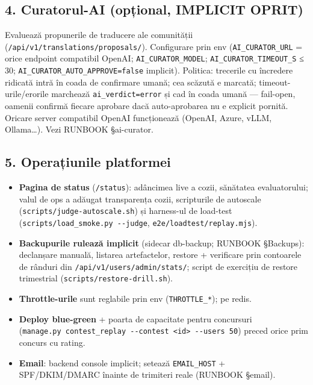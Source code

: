 \documentclass[
]{article}
\providecommand{\tightlist}{%
  \setlength{\itemsep}{0pt}\setlength{\parskip}{0pt}}
\begin{document}
\subsection{4. Curatorul-AI (opțional, IMPLICIT
OPRIT)}\label{4-curatorul-ai-opux21bional-implicit-oprit}

Evaluează propunerile de traducere ale comunității
(\texttt{/api/v1/translations/proposals/}). Configurare prin env
(\texttt{AI\_CURATOR\_URL} = orice endpoint compatibil OpenAI;
\texttt{AI\_CURATOR\_MODEL}; \texttt{AI\_CURATOR\_TIMEOUT\_S} ≤ 30;
\texttt{AI\_CURATOR\_AUTO\_APPROVE=false} implicit). Politica: trecerile
cu încredere ridicată intră în coada de confirmare umană; cea scăzută e
marcată; timeout-urile/erorile marchează \texttt{ai\_verdict=error} și
cad în coada umană --- fail-open, oamenii confirmă fiecare aprobare dacă
auto-aprobarea nu e explicit pornită. Oricare server compatibil OpenAI
funcționează (OpenAI, Azure, vLLM, Ollama\ldots). Vezi RUNBOOK
§ai-curator.

\subsection{5. Operațiunile
platformei}\label{5-operaux21biunile-platformei}

\begin{itemize}
\tightlist
\item
  \textbf{Pagina de status} (\texttt{/status}): adâncimea live a cozii,
  sănătatea evaluatorului; valul de ops a adăugat transparența cozii,
  scripturile de autoscale (\texttt{scripts/judge-autoscale.sh}) și
  harness-ul de load-test (\texttt{scripts/load\_smoke.py\ -\/-judge},
  \texttt{e2e/loadtest/replay.mjs}).
\item
  \textbf{Backupurile rulează implicit} (sidecar db-backup; RUNBOOK
  §Backups): declanșare manuală, listarea artefactelor, restore +
  verificare prin contoarele de rânduri din
  \texttt{/api/v1/users/admin/stats/}; script de exercițiu de restore
  trimestrial (\texttt{scripts/restore-drill.sh}).
\item
  \textbf{Throttle-urile} sunt reglabile prin env
  (\texttt{THROTTLE\_*}); pe redis.
\item
  \textbf{Deploy blue-green} + poarta de capacitate pentru concursuri
  (\texttt{manage.py\ contest\_replay\ -\/-contest\ \textless{}id\textgreater{}\ -\/-users\ 50})
  preced orice prim concurs cu rating.
\item
  \textbf{Email}: backend console implicit; setează \texttt{EMAIL\_HOST}
  + SPF/DKIM/DMARC înainte de trimiteri reale (RUNBOOK §email).
\end{itemize}
\end{document}
